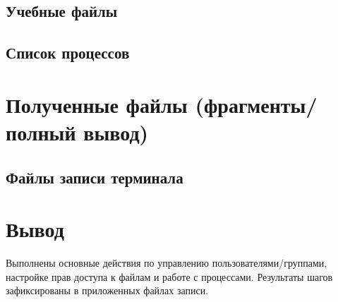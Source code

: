 \subsection{Учебные файлы}



\subsection{Список процессов}


\section{Полученные файлы (фрагменты/полный вывод)}
\subsection{Файлы записи терминала}




\section{Вывод}
Выполнены основные действия по управлению пользователями/группами, настройке прав доступа к файлам и работе с процессами. Результаты шагов зафиксированы в приложенных файлах записи.
